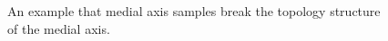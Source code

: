 \documentclass[11pt]{article}
\begin{document}
\begin{figure}
	\caption{\label{badthing}} An example that medial axis samples break the topology structure of the medial axis.
\end{figure}
\end{document}
